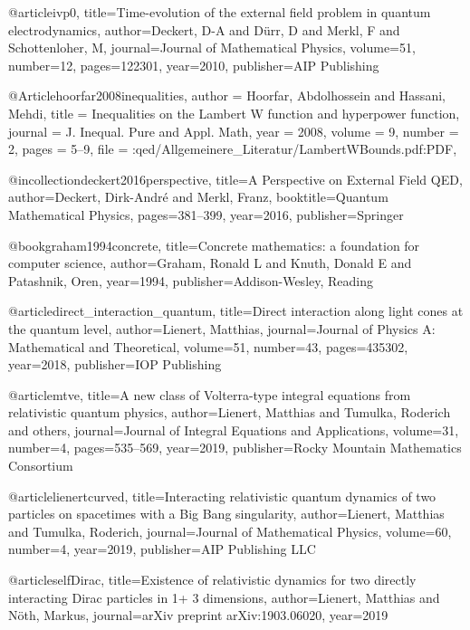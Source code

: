 @article{ivp0,
  title={Time-evolution of the external field problem in quantum electrodynamics},
  author={Deckert, D-A and D{\"u}rr, D and Merkl, F and Schottenloher, M},
  journal={Journal of Mathematical Physics},
  volume={51},
  number={12},
  pages={122301},
  year={2010},
  publisher={AIP Publishing}
}


@Article{hoorfar2008inequalities,
  author  = {Hoorfar, Abdolhossein and Hassani, Mehdi},
  title   = {Inequalities on the Lambert W function and hyperpower function},
  journal = {J. Inequal. Pure and Appl. Math},
  year    = {2008},
  volume  = {9},
  number  = {2},
  pages   = {5--9},
  file    = {:qed/Allgemeinere_Literatur/LambertWBounds.pdf:PDF},
}



@incollection{deckert2016perspective,
  title={A Perspective on External Field QED},
  author={Deckert, Dirk-Andr{\'e} and Merkl, Franz},
  booktitle={Quantum Mathematical Physics},
  pages={381--399},
  year={2016},
  publisher={Springer}
}

@book{graham1994concrete,
  title={Concrete mathematics: a foundation for computer science},
  author={Graham, Ronald L and Knuth, Donald E and Patashnik, Oren},
  year={1994},
  publisher={Addison-Wesley, Reading}
}

@article{direct_interaction_quantum,
  title={Direct interaction along light cones at the quantum level},
  author={Lienert, Matthias},
  journal={Journal of Physics A: Mathematical and Theoretical},
  volume={51},
  number={43},
  pages={435302},
  year={2018},
  publisher={IOP Publishing}
}



@article{mtve,
  title={A new class of Volterra-type integral equations from relativistic quantum physics},
  author={Lienert, Matthias and Tumulka, Roderich and others},
  journal={Journal of Integral Equations and Applications},
  volume={31},
  number={4},
  pages={535--569},
  year={2019},
  publisher={Rocky Mountain Mathematics Consortium}
}

@article{lienertcurved,
  title={Interacting relativistic quantum dynamics of two particles on spacetimes with a Big Bang singularity},
  author={Lienert, Matthias and Tumulka, Roderich},
  journal={Journal of Mathematical Physics},
  volume={60},
  number={4}, 
  year={2019},
  publisher={AIP Publishing LLC}
}

@article{selfDirac,
  title={Existence of relativistic dynamics for two directly interacting Dirac particles in 1+ 3 dimensions},
  author={Lienert, Matthias and N{\"o}th, Markus},
  journal={arXiv preprint arXiv:1903.06020},
  year={2019}
}


